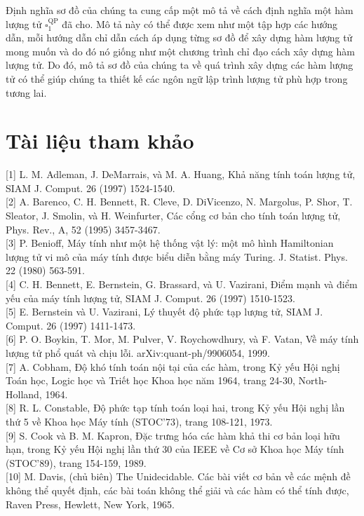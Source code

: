 \documentclass[10pt]{article}
\begin{document}
\begin{enumerate}
Định nghĩa sơ đồ của chúng ta cung cấp một mô tả về cách định nghĩa một hàm lượng tử $\square_{1}^{\mathrm{QP}}$ đã cho. Mô tả này có thể được xem như một tập hợp các hướng dẫn, mỗi hướng dẫn chỉ dẫn cách áp dụng từng sơ đồ để xây dựng hàm lượng tử mong muốn và do đó nó giống như một chương trình chỉ đạo cách xây dựng hàm lượng tử. Do đó, mô tả sơ đồ của chúng ta về quá trình xây dựng các hàm lượng tử có thể giúp chúng ta thiết kế các ngôn ngữ lập trình lượng tử phù hợp trong tương lai.

\section*{Tài liệu tham khảo}
[1] L. M. Adleman, J. DeMarrais, và M. A. Huang, Khả năng tính toán lượng tử, SIAM J. Comput. 26 (1997) 1524-1540.\\[0pt]
[2] A. Barenco, C. H. Bennett, R. Cleve, D. DiVicenzo, N. Margolus, P. Shor, T. Sleator, J. Smolin, và H. Weinfurter, Các cổng cơ bản cho tính toán lượng tử, Phys. Rev., A, 52 (1995) 3457-3467.\\[0pt]
[3] P. Benioff, Máy tính như một hệ thống vật lý: một mô hình Hamiltonian lượng tử vi mô của máy tính được biểu diễn bằng máy Turing. J. Statist. Phys. 22 (1980) 563-591.\\[0pt]
[4] C. H. Bennett, E. Bernstein, G. Brassard, và U. Vazirani, Điểm mạnh và điểm yếu của máy tính lượng tử, SIAM J. Comput. 26 (1997) 1510-1523.\\[0pt]
[5] E. Bernstein và U. Vazirani, Lý thuyết độ phức tạp lượng tử, SIAM J. Comput. 26 (1997) 1411-1473.\\[0pt]
[6] P. O. Boykin, T. Mor, M. Pulver, V. Roychowdhury, và F. Vatan, Về máy tính lượng tử phổ quát và chịu lỗi. arXiv:quant-ph/9906054, 1999.\\[0pt]
[7] A. Cobham, Độ khó tính toán nội tại của các hàm, trong Kỷ yếu Hội nghị Toán học, Logic học và Triết học Khoa học năm 1964, trang 24-30, North-Holland, 1964.\\[0pt]
[8] R. L. Constable, Độ phức tạp tính toán loại hai, trong Kỷ yếu Hội nghị lần thứ 5 về Khoa học Máy tính (STOC'73), trang 108-121, 1973.\\[0pt]
[9] S. Cook và B. M. Kapron, Đặc trưng hóa các hàm khả thi cơ bản loại hữu hạn, trong Kỷ yếu Hội nghị lần thứ 30 của IEEE về Cơ sở Khoa học Máy tính (STOC'89), trang 154-159, 1989.\\[0pt]
[10] M. Davis, (chủ biên) The Unidecidable. Các bài viết cơ bản về các mệnh đề không thể quyết định, các bài toán không thể giải và các hàm có thể tính được, Raven Press, Hewlett, New York, 1965.\\[0pt]

\end{enumerate}
\end{document}
